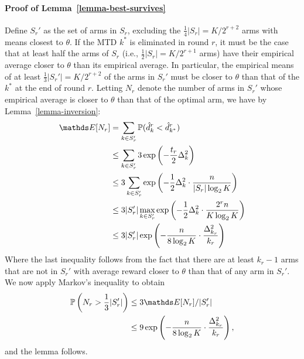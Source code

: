 \paragraph{Proof of Lemma~\ref{lemma-best-survives}}
Define $S_r'$ as the set of arms in $S_r$, excluding the
$\frac{1}{4}|S_r| = K/2^{r+2}$ arms with means closest to $\theta$.
If the MTD $k^*$ is eliminated in round $r$,
it must be the case that at least half the arms of $S_r$
(i.e., $\frac{1}{2}|S_r| = K/2^{r+1}$ arms)
have their empirical average closer to $\theta$ than its empirical
average.
In particular, the empirical means of at least
$\frac{1}{3}|S_r'| = K/2^{r+2}$ of the arms in $S_r'$ must be closer to
$\theta$ than that of the $k^*$ at the end of round $r$.
Letting $N_r$ denote the number of arms in $S_r'$ whose empirical average
is closer to $\theta$ than that of the optimal arm, we have by
Lemma~\ref{lemma-inversion}:
\begin{align*}
	\E[N_r] &= \sum_{k \in S_r'}
		\P(\hat d^r_k < \hat d^r_{k^*})
\\
	&\le \sum_{k \in S_r'} 3 \exp\left( -\frac{t_r}{2} \Delta^2_k \right)
\\
	&\le 3 \sum_{k \in S_r'} \exp\left( -\frac{1}{2} \Delta^2_k
		\cdot \frac{n}{|S_r| \log_2 K} \right)
\\
	&\le 3 |S_r'| \max_{k \in S_r'} \exp\left( -\frac{1}{2} \Delta^2_k
		\cdot \frac{2^r n}{K \log_2 K} \right)
\\
	&\le 3 |S_r'| \exp\left( -\frac{n}{8 \log_2 K}
		\cdot \frac{\Delta^2_{k_r}}{k_r} \right)
\end{align*}
Where the last inequality follows from the fact that there are at least
$k_r - 1$ arms that are not in $S_r'$ with average reward closer to $\theta$
than that of any arm in $S_r'$.
We now apply Markov's inequality to obtain
\begin{align*}
\P\left(N_r > \frac{1}{3}|S_r'|\right) &\le 3 \E[N_r] / |S_r'|
\\
	&\le 9 \exp \left(
		- \frac{n}{8 \log_2 K}
		\cdot \frac{\Delta^2_{k_r}}{k_r}
	\right),
\end{align*}
and the lemma follows.

